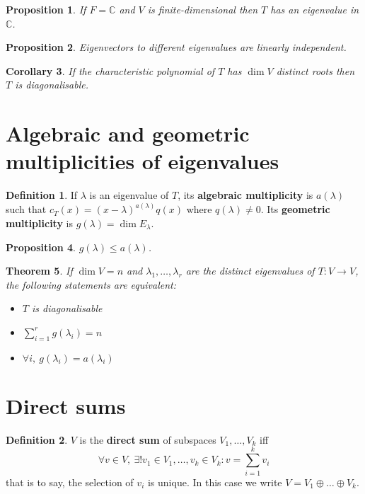 \documentclass[12pt]{article}
\newtheorem{thm}{Theorem}[section]
\newtheorem{cor}[thm]{Corollary}
\newtheorem{prop}[thm]{Proposition}
\theoremstyle{definition}
\newtheorem*{defn*}{Definition}
\begin{document}
\begin{prop}
	If $F = \mathbb{C}$ and $V$ is finite-dimensional then $T$ has an eigenvalue in $\mathbb{C}$.
\end{prop}

\begin{prop}
	Eigenvectors to different eigenvalues are linearly independent.
\end{prop}

\begin{cor}
	If the characteristic polynomial of $T$ has $\dim{V}$ distinct roots then $T$ is diagonalisable.
\end{cor}

\section{Algebraic and geometric multiplicities of eigenvalues}

\begin{defn*}
	If $\lambda$ is an eigenvalue of $T$, its \textbf{algebraic multiplicity} is $a(\lambda)$ such that $c_T(x) = (x - \lambda)^{a(\lambda)}q(x)$ where $q(\lambda) \neq 0$.
	Its \textbf{geometric multiplicity} is $g(\lambda) = \dim{E_{\lambda}}$.
\end{defn*}

\begin{prop}
	$g(\lambda) \leq a(\lambda)$.
\end{prop}

\begin{thm}
	If $\dim{V} = n$ and $\lambda_1, \ldots, \lambda_r$ are the distinct eigenvalues of $T : V \to V$, the following statements are equivalent:
	\begin{itemize}
		\item $T$ is diagonalisable
		\item $\sum_{i = 1}^rg(\lambda_i) = n$
		\item $\forall i,\ g(\lambda_i) = a(\lambda_i)$
	\end{itemize}
\end{thm}

\section{Direct sums}

\begin{defn*}
	$V$ is the \textbf{direct sum} of subspaces $V_1, \ldots, V_k$ iff
	$$\forall v \in V,\ \exists! v_1 \in V_1, \ldots, v_k \in V_k : v = \sum_{i = 1}^kv_i$$
	that is to say, the selection of $v_i$ is unique.
	In this case we write $V = V_1 \oplus \ldots \oplus V_k$.
\end{defn*}
\end{document}
